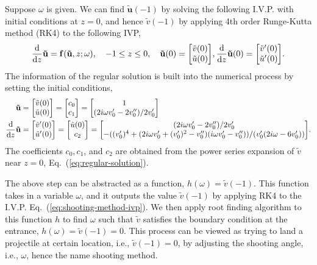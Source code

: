 Suppose $\omega$ is given. We can find $\mathbf{\tilde{u}}(-1)$ by solving the following I.V.P. with initial conditions at $z=0$, and hence $\tilde{v}(-1)$ by applying 4th order Runge-Kutta method (RK4) to the following IVP,
\begin{equation}
	\dv{z}\mathbf{\tilde{u}} = \mathbf{f}(\mathbf{\tilde{u}},z;\omega), \quad
	-1 \leq z \leq 0, \quad
	\mathbf{\tilde{u}}(0)=\mqty[\tilde{v}(0) \\ \tilde{u}(0)], \dv{z}\mathbf{\tilde{u}}(0) =\mqty[\tilde{v}'(0) \\ \tilde{u}'(0)].
	\label{eq:shooting-method-ivp}
\end{equation}
The information of the regular solution is built into the numerical process by setting the initial conditions,
\begin{equation}
	\begin{aligned}
		\mathbf{\tilde{u}}       & = \mqty[\tilde{v}(0)  \\ \tilde{u}(0)]
		= \mqty[c_0                                      \\ c_1]
		= \mqty[1                                        \\ (2i\omega v_0'-2v_0'')/2v_0'] \\
		\dv{z}\mathbf{\tilde{u}} & = \mqty[\tilde{v}'(0) \\ \tilde{u}'(0)]
		= \mqty[\tilde{u}(0)                             \\ c_2]
		= \mqty[(2i\omega v_0'-2v_0'')/2v_0'             \\ -((v_0')^4+(2i\omega v_0' + (v_0')^2 - v_0'')(i\omega v_0' - v_0''))/(v_0'(2i\omega-6v_0'))].
	\end{aligned}
\end{equation}
The coefficients $c_0, c_1$, and $c_2$ are obtained from the power series expansion of $\tilde{v}$ near $z=0$, Eq.~(\ref{eq:regular-solution}).

The above step can be abstracted as a function, $h(\omega) = \tilde{v}(-1)$. This function takes in a variable $\omega$, and it outputs the value $\tilde{v}(-1)$ by applying RK4 to the I.V.P. Eq.~(\ref{eq:shooting-method-ivp}). We then apply root finding algorithm to this function $h$ to find $\omega$ such that $\tilde{v}$ satisfies the boundary condition at the entrance, $h(\omega)=\tilde{v}(-1)=0$. This process can be viewed as trying to land a projectile at certain location, i.e., $\tilde{v}(-1)=0$, by adjusting the shooting angle, i.e., $\omega$, hence the name shooting method.

